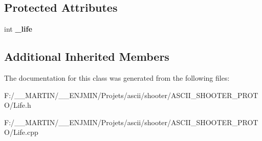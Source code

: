 \subsection*{Protected Attributes}
\begin{DoxyCompactItemize}
\item 
\hypertarget{class_life_a30ed082fad4dd9a0fdf6850ed7b469aa}{}\label{class_life_a30ed082fad4dd9a0fdf6850ed7b469aa} 
int {\bfseries \+\_\+life}
\end{DoxyCompactItemize}
\subsection*{Additional Inherited Members}


The documentation for this class was generated from the following files\+:\begin{DoxyCompactItemize}
\item 
F\+:/\+\_\+\+\_\+\+M\+A\+R\+T\+I\+N/\+\_\+\+\_\+\+E\+N\+J\+M\+I\+N/\+Projets/ascii/shooter/\+A\+S\+C\+I\+I\+\_\+\+S\+H\+O\+O\+T\+E\+R\+\_\+\+P\+R\+O\+T\+O/Life.\+h\item 
F\+:/\+\_\+\+\_\+\+M\+A\+R\+T\+I\+N/\+\_\+\+\_\+\+E\+N\+J\+M\+I\+N/\+Projets/ascii/shooter/\+A\+S\+C\+I\+I\+\_\+\+S\+H\+O\+O\+T\+E\+R\+\_\+\+P\+R\+O\+T\+O/Life.\+cpp\end{DoxyCompactItemize}
